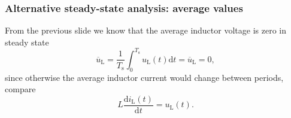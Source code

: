 \begin{frame}
    \frametitle{Alternative steady-state analysis: average values}
    From the previous slide we know that the average inductor voltage is zero in steady state
    \begin{equation}
        \overline{u}_\mathrm{L} = \frac{1}{T_\mathrm{s}} \int_{0}^{T_\mathrm{s}} u_\mathrm{L}(t) \mathrm{d}t = \overline{u}_\mathrm{L} = 0,
    \end{equation}
    since otherwise the average inductor current would change between periods, compare
    $$
    L \frac{\mathrm{d}i_\mathrm{L}(t)}{\mathrm{d}t} =  u_\mathrm{L}(t).
    $$
\end{frame}